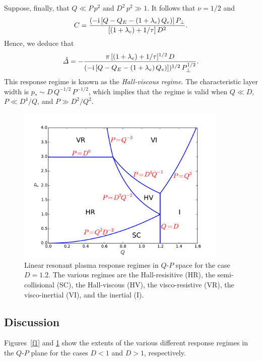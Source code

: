 \documentclass[notitlepage,12pt]{article}
\begin{document}
Suppose, finally, that $Q\ll P\,p^2$ and $D^2\,p^2\gg 1$. It follows that $\nu=1/2$ and
\begin{equation}
C = \frac{(-{\rm i}\,[Q-Q_E-(1+\lambda_e)\,Q_e)]\,P_\perp}{[(1+\lambda_e)+1/\tau]\,D^2}.
\end{equation}
Hence, we deduce that
\begin{equation}
\hat{\mit\Delta}= -\frac{\pi\,[(1+\lambda_e)+1/\tau]^{1/2}\,D}{(-{\rm i}\,[Q-Q_E-(1+\lambda_e)\,Q_e)])^{1/2}\,P_\perp^{1/2}}.
\end{equation}
This response regime is known as the {\em Hall-viscous regime}. The characteristic layer width is $p_\ast\sim
D\,Q^{-1/2}\,P^{-1/2}$, which implies that the regime is valid when $Q\ll D$, $P\ll D^4/Q$, and $P\gg D^2/Q^2$. 

\begin{figure}
\centerline{\includegraphics[width=0.9\textwidth]{RegimeII.pdf}}
\caption{Linear resonant plasma response regimes in $Q$-$P$ space for the case $D=1.2$. The various regimes are
the Hall-resisitive (HR), the semi-collisional (SC), the Hall-viscous (HV), the visco-resistive (VR), the visco-inertial
(VI), and the inertial (I).}\label{f2}
\end{figure}

\subsection{Discussion}\label{dis1}
Figures~\ref{f1} and \ref{f2} show the extents of the various different response regimes in the $Q$-$P$ plane for the
cases $D<1$ and $D>1$, respectively. 
\end{document}
